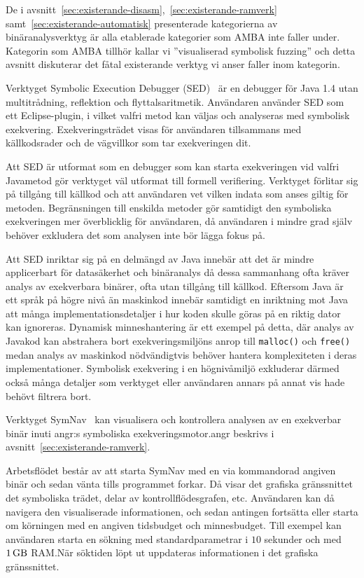 De i avsnitt~\ref{sec:existerande-disasm},\ \ref{sec:existerande-ramverk} samt\
\ref{sec:existerande-automatisk} presenterade kategorierna av binäranalysverktyg
är alla etablerade kategorier som AMBA inte faller under. Kategorin som AMBA
tillhör kallar vi ''visualiserad symbolisk fuzzing'' och detta avsnitt
diskuterar det fåtal existerande verktyg vi anser faller inom kategorin.

Verktyget Symbolic Execution Debugger
(\textsc{SED})~\cite{symbolic_execution_debugger} är en debugger för Java 1.4
utan multitrådning, reflektion och flyttalsaritmetik. Användaren använder
\textsc{SED} som ett Eclipse-plugin, i vilket valfri metod kan väljas och
analyseras med symbolisk exekvering. Exekveringsträdet visas för användaren
tillsammans med källkodsrader och de vägvillkor som tar exekveringen dit.

Att \textsc{SED} är utformat som en debugger som kan starta exekveringen vid
valfri Javametod gör verktyget väl utformat till formell verifiering. Verktyget
förlitar sig på tillgång till källkod och att användaren vet vilken indata som
anses giltig för metoden. Begränsningen till enskilda metoder gör samtidigt den
symboliska exekveringen mer överblicklig för användaren, då användaren i mindre
grad själv behöver exkludera det som analysen inte bör lägga fokus på.

Att \textsc{SED} inriktar sig på en delmängd av Java innebär att det är mindre
applicerbart för datasäkerhet och binäranalys då dessa sammanhang ofta kräver
analys av exekverbara binärer, ofta utan tillgång till källkod. Eftersom Java är
ett språk på högre nivå än maskinkod innebär samtidigt en inriktning mot Java
att många implementationsdetaljer i hur koden skulle göras på en riktig dator
kan ignoreras. Dynamisk minneshantering är ett exempel på detta, där analys av
Javakod kan abstrahera bort exekveringsmiljöns anrop till \verb|malloc()| och
\verb|free()| medan analys av maskinkod nödvändigtvis behöver hantera
komplexiteten i deras implementationer. Symbolisk exekvering i en högnivåmiljö
exkluderar därmed också många detaljer som verktyget eller användaren annars på
annat vis hade behövt filtrera bort.

Verktyget SymNav~\cite{symnav} kan visualisera och kontrollera analysen av en
exekverbar binär inuti angr:s symboliska exekveringsmotor.\@ angr beskrivs i
avsnitt~\ref{sec:existerande-ramverk}.

Arbetsflödet består av att starta SymNav med en via kommandorad angiven binär
och sedan vänta tills programmet forkar. Då visar det grafiska gränssnittet det
symboliska trädet, delar av kontrollflödesgrafen, etc. Användaren kan då
navigera den visualiserade informationen, och sedan antingen fortsätta eller
starta om körningen med en angiven tidsbudget och minnesbudget. Till exempel kan
användaren starta en sökning med standardparametrar i $10$ sekunder och med
$\SI{1}{\giga\byte}$ RAM.\@ När söktiden löpt ut uppdateras informationen i
det grafiska gränssnittet.

